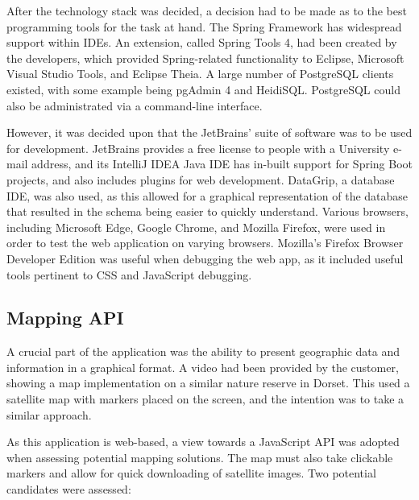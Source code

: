 After the technology stack was decided, a decision had to be made as to the best programming tools for the task at hand. The Spring Framework has widespread support within IDEs. An extension, called Spring Tools 4, had been created by the developers, which provided Spring-related functionality to Eclipse, Microsoft Visual Studio Tools, and Eclipse Theia. A large number of PostgreSQL clients existed, with some example being pgAdmin 4 and HeidiSQL. PostgreSQL could also be administrated via a command-line interface.

However, it was decided upon that the JetBrains' suite of software was to be used for development. JetBrains provides a free license to people with a University e-mail address, and its IntelliJ IDEA Java IDE has in-built support for Spring Boot projects, and also includes plugins for web development. DataGrip, a database IDE, was also used, as this allowed for a graphical representation of the database that resulted in the schema being easier to quickly understand. Various browsers, including Microsoft Edge, Google Chrome, and Mozilla Firefox, were used in order to test the web application on varying browsers. Mozilla's Firefox Browser Developer Edition was useful when debugging the web app, as it included useful tools pertinent to CSS and JavaScript debugging.

\subsection{Mapping API}

A crucial part of the application was the ability to present geographic data and information in a graphical format. A video had been provided by the customer, showing a map implementation on a similar nature reserve in Dorset. This used a satellite map with markers placed on the screen, and the intention was to take a similar approach.

As this application is web-based, a view towards a JavaScript API was adopted when assessing potential mapping solutions. The map must also take clickable markers and allow for quick downloading of satellite images. Two potential candidates were assessed:

